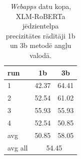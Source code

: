 

\begin{table}[htbp]
  \centering
  \caption{\textit{Webapps} datu kopa, XLM-RoBERTa jēdzientelpa precizitātes rādītāji 1b un 3b metodē angļu valodā.}
    \begin{tabular}{lcc}\toprule
    run   & 1b & 3b \\\midrule
    1 & 42.37 & 64.41 \\
    2 & 52.54 & 61.02 \\
    3 & 55.93 & 55.93 \\
    4 & 52.54 & 50.85 \\\midrule
    avg   & 50.85 & 58.05 \\
    avg all & \multicolumn{2}{c}{54.45} \\\bottomrule
    \end{tabular}%
  \label{tab:13b-webapps}%
\end{table}%







